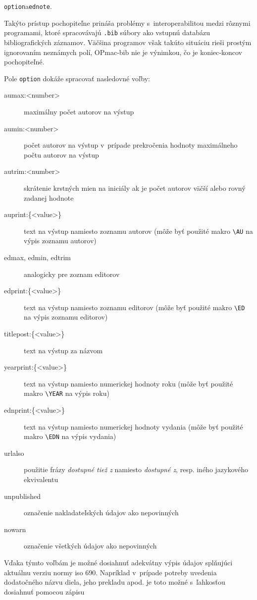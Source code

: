 \documentclass[
  color,
  table,
  nolof,
  oneside,
]{fithesis3}
\begin{document}
\begin{center}
\texttt{option}\enspace a\enspace \texttt{ednote}.
\end{center}

\noindent Takýto prístup pochopiteľne prináša problémy s~interoperabilitou medzi rôznymi programami, ktoré spracovávajú \texttt{.bib} súbory ako vstupnú databázu bibliografických záznamov. Väčšina programov však takúto situáciu rieši prostým ignorovaním neznámych polí, OPmac-bib nie je výnimkou, čo je koniec-koncov pochopiteľné.

Pole \texttt{option} dokáže spracovať nasledovné voľby:

\begin{description}
  \item[aumax:<number>] maximálny počet autorov na výstup
  \item[aumin:<number>] počet autorov na výstup v~prípade prekročenia hodnoty maximálneho počtu autorov na výstup
  \item[autrim:<number>] skrátenie krstných mien na iniciály ak je počet autorov väčší alebo rovný zadanej hodnote
  \item[auprint:\{<value>\}] text na výstup namiesto zoznamu autorov (môže byť použité makro \verb|\AU| na výpis zoznamu autorov)
  \item[edmax, edmin, edtrim] analogicky pre zoznam editorov
  \item[edprint:\{<value>\}] text na výstup namiesto zoznamu editorov (môže byť použité makro \verb|\ED| na výpis zoznamu editorov)
  \item[titlepost:\{<value>\}] text na výstup za názvom
  \item[yearprint:\{<value>\}] text na výstup namiesto numerickej hodnoty roku (môže byť použité makro \verb|\YEAR| na výpis roku)
  \item[ednprint:\{<value>\}] text na výstup namiesto numerickej hodnoty vydania (môže byť použité makro \verb|\EDN| na výpis vydania)
  \item[urlalso] použitie frázy \textit{dostupné tiež z} namiesto \textit{dostupné z}, resp. iného jazykového ekvivalentu
  \item[unpublished] označenie nakladateľských údajov ako nepovinných
  \item[nowarn] označenie všetkých údajov ako nepovinných
\end{description}

Vďaka týmto voľbám je možné dosiahnuť adekvátny výpis údajov splňujúci aktuálnu verziu normy \gls{iso} 690. Napríklad v~prípade potreby uvedenia dodatočného názvu diela, jeho prekladu apod. je toto možné s~ľahkosťou dosiahnuť pomocou zápisu
\end{document}
